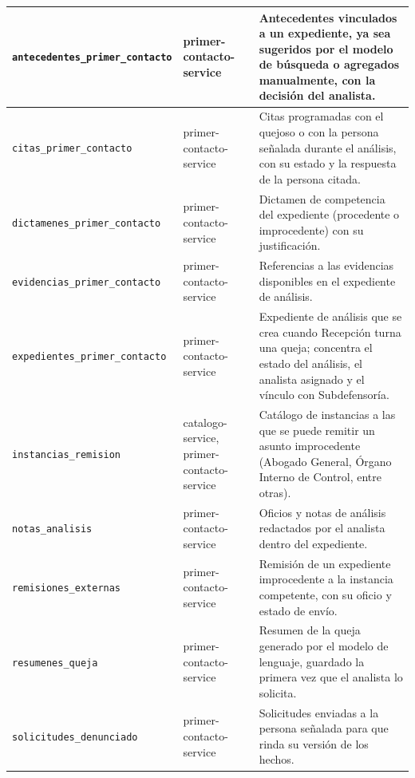 \begin{longtable}{|L{4.6cm}|L{3.6cm}|L{7.4cm}|}
	\texttt{antecedentes\_\allowbreak{}primer\_\allowbreak{}contacto} & primer-\allowbreak{}contacto-\allowbreak{}service & Antecedentes vinculados a un expediente, ya sea sugeridos por el modelo de búsqueda o agregados manualmente, con la decisión del analista. \\ \hline
	\texttt{citas\_\allowbreak{}primer\_\allowbreak{}contacto} & primer-\allowbreak{}contacto-\allowbreak{}service & Citas programadas con el quejoso o con la persona señalada durante el análisis, con su estado y la respuesta de la persona citada. \\ \hline
	\texttt{dictamenes\_\allowbreak{}primer\_\allowbreak{}contacto} & primer-\allowbreak{}contacto-\allowbreak{}service & Dictamen de competencia del expediente (procedente o improcedente) con su justificación. \\ \hline
	\texttt{evidencias\_\allowbreak{}primer\_\allowbreak{}contacto} & primer-\allowbreak{}contacto-\allowbreak{}service & Referencias a las evidencias disponibles en el expediente de análisis. \\ \hline
	\texttt{expedientes\_\allowbreak{}primer\_\allowbreak{}contacto} & primer-\allowbreak{}contacto-\allowbreak{}service & Expediente de análisis que se crea cuando Recepción turna una queja; concentra el estado del análisis, el analista asignado y el vínculo con Subdefensoría. \\ \hline
	\texttt{instancias\_\allowbreak{}remision} & catalogo-\allowbreak{}service, primer-\allowbreak{}contacto-\allowbreak{}service & Catálogo de instancias a las que se puede remitir un asunto improcedente (Abogado General, Órgano Interno de Control, entre otras). \\ \hline
	\texttt{notas\_\allowbreak{}analisis} & primer-\allowbreak{}contacto-\allowbreak{}service & Oficios y notas de análisis redactados por el analista dentro del expediente. \\ \hline
	\texttt{remisiones\_\allowbreak{}externas} & primer-\allowbreak{}contacto-\allowbreak{}service & Remisión de un expediente improcedente a la instancia competente, con su oficio y estado de envío. \\ \hline
	\texttt{resumenes\_\allowbreak{}queja} & primer-\allowbreak{}contacto-\allowbreak{}service & Resumen de la queja generado por el modelo de lenguaje, guardado la primera vez que el analista lo solicita. \\ \hline
	\texttt{solicitudes\_\allowbreak{}denunciado} & primer-\allowbreak{}contacto-\allowbreak{}service & Solicitudes enviadas a la persona señalada para que rinda su versión de los hechos. \\ \hline

\end{longtable}
